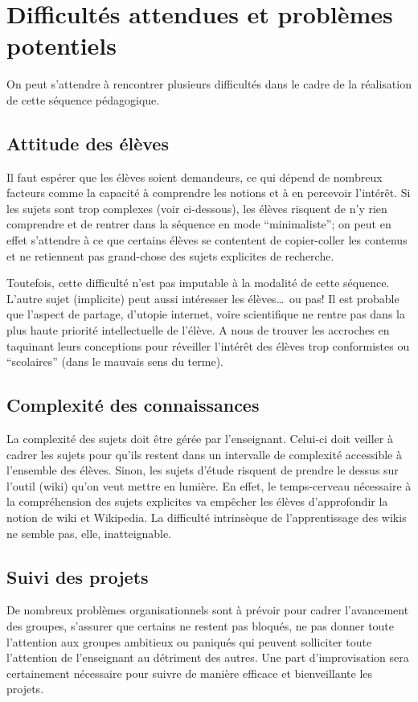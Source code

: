 \documentclass[11pt,bibliography=totoc]{scrartcl}
\begin{document}
\section{Difficultés attendues et problèmes potentiels}
On peut s'attendre à rencontrer plusieurs difficultés dans le cadre de la
réalisation de cette séquence pédagogique.

\subsection{Attitude des élèves}
Il faut espérer que les élèves soient demandeurs, ce qui dépend de nombreux
facteurs comme la capacité à comprendre les notions et à en percevoir
l'intérêt. Si les sujets sont trop complexes (voir ci-dessous), les élèves
risquent de n'y rien comprendre et de rentrer dans la séquence en mode
``minimaliste''; on peut en effet s'attendre à ce que certains élèves se
contentent de copier-coller les contenus et ne retiennent pas grand-chose des
sujets explicites de recherche.

Toutefois, cette difficulté n'est pas imputable à la modalité de cette séquence.
L'autre sujet (implicite) peut aussi intéresser les élèves\ldots\ ou pas! Il est
probable que l'aspect de partage, d'utopie internet, voire scientifique ne
rentre pas dans la plus haute priorité intellectuelle de l'élève. A nous de
trouver les accroches en taquinant leurs conceptions pour réveiller l'intérêt
des élèves trop conformistes ou ``scolaires'' (dans le mauvais sens du terme).

\subsection{Complexité des connaissances}
La complexité des sujets doit être gérée par l'enseignant. Celui-ci doit veiller
à cadrer les sujets pour qu'ils restent dans un intervalle de complexité
accessible à l'ensemble des élèves. Sinon, les sujets d'étude risquent de
prendre le dessus sur l'outil (wiki) qu'on veut mettre en lumière. En effet, le
temps-cerveau nécessaire à la compréhension des sujets explicites va empêcher
les élèves d'approfondir la notion de wiki et Wikipedia.  La difficulté
intrinsèque de l'apprentissage des wikis ne semble pas, elle, inatteignable.

\subsection{Suivi des projets}
De nombreux problèmes organisationnels sont à prévoir pour cadrer l'avancement
des groupes, s'assurer que certains ne restent pas bloqués, ne pas donner toute
l'attention aux groupes ambitieux ou paniqués qui peuvent solliciter toute
l'attention de l'enseignant au détriment des autres.  Une part d'improvisation
sera certainement nécessaire pour suivre de manière efficace et bienveillante
les projets.
\end{document}
